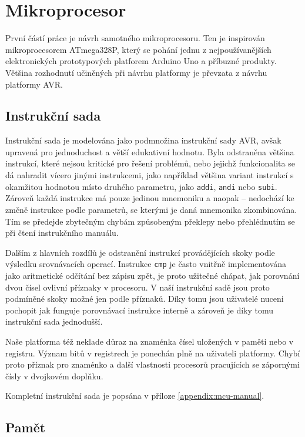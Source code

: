 \chapter{Mikroprocesor}

První částí práce je návrh samotného mikroprocesoru. Ten je inspirován mikroprocesorem ATmega328P, který se pohání jednu z nejpoužívanějších elektronických prototypových platforem Arduino Uno a příbuzné produkty. Většina rozhodnutí učiněných při návrhu platformy je převzata z návrhu platformy AVR.

\section{Instrukční sada}

Instrukční sada je modelována jako podmnožina instrukční sady AVR, avšak upravená pro jednoduchost a větší edukativní hodnotu. Byla odstraněna většina instrukcí, které nejsou kritické pro řešení problémů, nebo jejichž funkcionalita se dá nahradit vícero jinými instrukcemi, jako například většina variant instrukcí s okamžitou hodnotou místo druhého parametru, jako \texttt{addi}, \texttt{andi} nebo \texttt{subi}. Zároveň každá instrukce má pouze jedinou mnemoniku a naopak -- nedochází ke změně instrukce podle parametrů, se kterými je daná mnemonika zkombinována. Tím se předejde zbytečným chybám způsobeným překlepy nebo přehlédnutím se při čtení instrukčního manuálu.

Dalším z hlavních rozdílů je odstranění instrukcí provádějících skoky podle výsledku srovnávacích operací. Instrukce \texttt{cmp} je často vnitřně implementována jako aritmetické odčítání bez zápisu zpět\todocite, je proto užitečné chápat, jak porovnání dvou čísel ovlivní příznaky v procesoru. V naší instrukční sadě jsou proto podmíněné skoky možné jen podle příznaků. Díky tomu jsou uživatelé nuceni pochopit jak funguje porovnávací instrukce interně a zároveň je díky tomu instrukční sada jednodušší.

Naše platforma též neklade důraz na znaménka čísel uložených v paměti nebo v registru. Význam bitů v registrech je ponechán plně na uživateli platformy. Chybí proto příznak pro znaménko a další vlastnosti procesorů pracujících se zápornými čísly v dvojkovém doplňku.

Kompletní instrukční sada je popsána v příloze \ref{appendix:mcu-manual}.

\section{Pamět}

